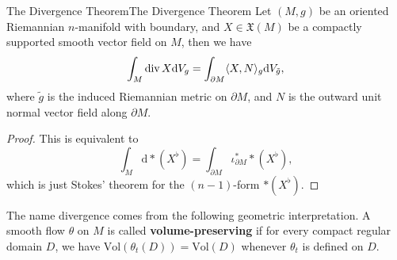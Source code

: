 \documentclass[../main.tex]{subfiles}
\begin{document}
\begin{theorem}{The Divergence Theorem}{The Divergence Theorem}
  Let $(M,g)$ be an oriented Riemannian $n$-manifold with boundary, and $X \in \mathfrak{X}(M)$ be a compactly supported smooth vector field on $M$, then we have
  \begin{equation}
    \int_M \operatorname{div} X \mathrm{d} V_g = \int_{\partial M} \langle X, N \rangle_g \mathrm{d} V_{\tilde{g}},
  \end{equation}
  where $\tilde{g}$ is the induced Riemannian metric on $\partial M$, and $N$ is the outward unit normal vector field along $\partial M$.
\end{theorem}
\begin{proof}
  This is equivalent to
  \begin{equation*}
    \int_M \mathrm{d} *(X^\flat) = \int_{\partial M} \iota^*_{\partial M} *(X^\flat),
  \end{equation*}
  which is just Stokes' theorem for the $(n-1)$-form $*(X^\flat)$.
\end{proof}

The name divergence comes from the following geometric interpretation. A smooth flow $\theta$ on $M$ is called \textbf{volume-preserving} if for every compact regular domain $D$, we have $\mathrm{Vol}(\theta_t(D)) = \mathrm{Vol}(D)$ whenever $\theta_t$ is defined on $D$.
\end{document}
